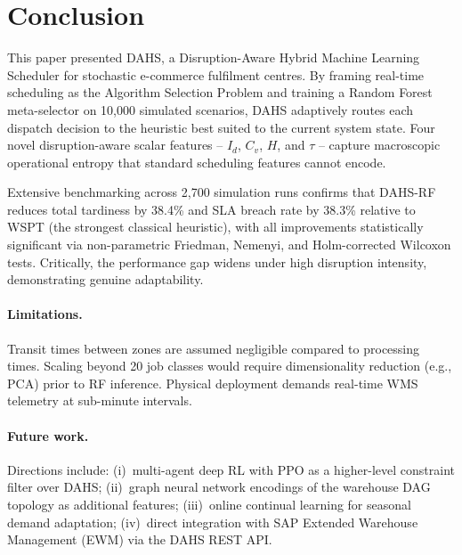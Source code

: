 \documentclass[3p,times]{elsarticle}
\begin{document}
\section{Conclusion}
\label{sec:conclusion}

This paper presented DAHS, a Disruption-Aware Hybrid Machine
Learning Scheduler for stochastic e-commerce fulfilment centres.
By framing real-time scheduling as the Algorithm Selection Problem
and training a Random Forest meta-selector on 10{,}000 simulated
scenarios, DAHS adaptively routes each dispatch decision to the
heuristic best suited to the current system state.  Four novel
disruption-aware scalar features -- $I_d$, $C_v$, $H$, and $\tau$
-- capture macroscopic operational entropy that standard scheduling
features cannot encode.

Extensive benchmarking across 2{,}700 simulation runs confirms that
DAHS-RF reduces total tardiness by 38.4\% and SLA breach rate by
38.3\% relative to WSPT (the strongest classical heuristic), with
all improvements statistically significant via non-parametric
Friedman, Nemenyi, and Holm-corrected Wilcoxon tests.  Critically,
the performance gap widens under high disruption intensity,
demonstrating genuine adaptability.

\paragraph{Limitations.}
Transit times between zones are assumed negligible compared to
processing times.  Scaling beyond 20 job classes would require
dimensionality reduction (e.g., PCA) prior to RF inference.  Physical
deployment demands real-time WMS telemetry at sub-minute intervals.

\paragraph{Future work.}
Directions include: (i)~multi-agent deep RL with PPO as a
higher-level constraint filter over DAHS; (ii)~graph neural network
encodings of the warehouse DAG topology as additional features;
(iii)~online continual learning for seasonal demand adaptation;
(iv)~direct integration with SAP Extended Warehouse Management
(EWM) via the DAHS REST API.

\end{document}
